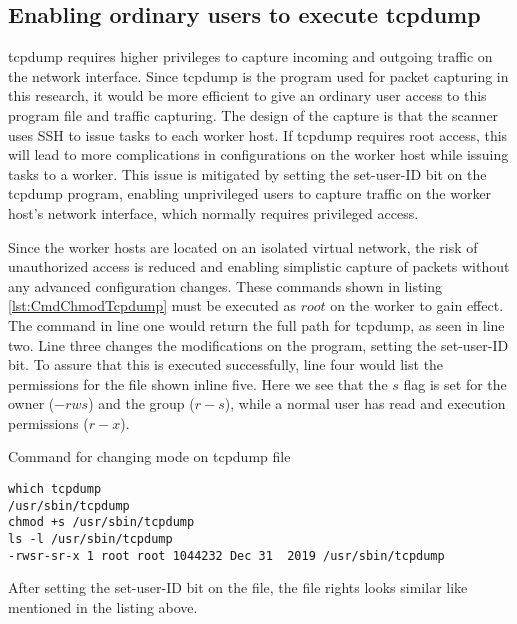 \subsection{Enabling ordinary users to execute tcpdump}
\label{s:EnableTCPDumpNormalUsers}
tcpdump requires higher privileges to capture incoming and outgoing traffic on the network interface.
Since tcpdump is the program used for packet capturing in this research, it would be more efficient to give an ordinary user access to this program file and traffic capturing.
The design of the capture is that the scanner uses SSH to issue tasks to each worker host.
If tcpdump requires root access, this will lead to more complications in configurations on the worker host while issuing tasks to a worker.
This issue is mitigated by setting the set-user-ID bit on the tcpdump program, enabling unprivileged users to capture traffic on the worker host's network interface, which normally requires privileged access.

Since the worker hosts are located on an isolated virtual network, the risk of unauthorized access is reduced and enabling simplistic capture of packets without any advanced configuration changes.
These commands shown in listing \ref{lst:CmdChmodTcpdump} must be executed as $root$ on the worker to gain effect. The command in line one would return the full path for tcpdump, as seen in line two.
Line three changes the modifications on the program, setting the set-user-ID bit.
To assure that this is executed successfully, line four would list the permissions for the file shown inline five. Here we see that the $s$ flag is set for the owner ($-rws$) and the group ($r-s$), while a normal user has read and execution permissions ($r-x$).

\begin{listing}[!ht]
\caption{Command for changing mode on tcpdump file}
\label{lst:CmdChmodTcpdump}
\begin{verbatim}
which tcpdump
/usr/sbin/tcpdump
chmod +s /usr/sbin/tcpdump
ls -l /usr/sbin/tcpdump
-rwsr-sr-x 1 root root 1044232 Dec 31  2019 /usr/sbin/tcpdump
\end{verbatim}
\end{listing}

After setting the set-user-ID bit on the file, the file rights looks similar like mentioned in the listing above.

